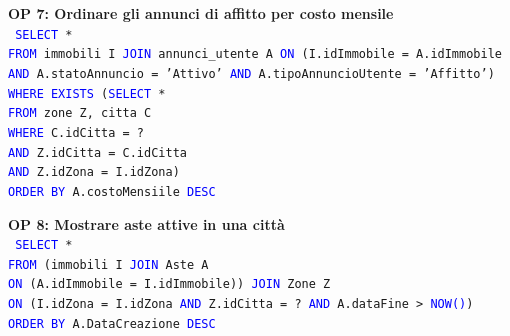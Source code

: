 \documentclass[a4paper,12pt]{report}
\begin{document}
            \noindent
            \textbf{OP 7: Ordinare gli annunci di affitto per costo mensile} \\
            \texttt{
                \textcolor{blue}{SELECT} * \\
                \textcolor{blue}{FROM} immobili I \textcolor{blue}{JOIN} annunci\_utente A \textcolor{blue}{ON} (I.idImmobile = A.idImmobile \textcolor{blue}{AND} A.statoAnnuncio = 'Attivo' \textcolor{blue}{AND} A.tipoAnnuncioUtente = 'Affitto') \\
                \textcolor{blue}{WHERE EXISTS} (\textcolor{blue}{SELECT} * \\
                    \null\qquad\qquad\qquad\quad\textcolor{blue}{FROM} zone Z, citta C \\
                    \null\qquad\qquad\qquad\quad\textcolor{blue}{WHERE} C.idCitta = ? \\
                    \null\qquad\qquad\qquad\quad\textcolor{blue}{AND} Z.idCitta = C.idCitta \\
                    \null\qquad\qquad\qquad\quad\textcolor{blue}{AND} Z.idZona = I.idZona) \\
                \textcolor{blue}{ORDER BY} A.costoMensiile \textcolor{blue}{DESC} \\
            }
            
            \noindent
            \textbf{OP 8: Mostrare aste attive in una città} \\
            \texttt{
                \textcolor{blue}{SELECT} * \\
                \textcolor{blue}{FROM} (immobili I \textcolor{blue}{JOIN} Aste A \\ 
                \textcolor{blue}{ON} (A.idImmobile = I.idImmobile)) \textcolor{blue}{JOIN} Zone Z \\ 
                \textcolor{blue}{ON} (I.idZona = I.idZona \textcolor{blue}{AND} Z.idCitta = ? \textcolor{blue}{AND} A.dataFine > \textcolor{blue}{NOW()}) \\
                \textcolor{blue}{ORDER BY} A.DataCreazione  \textcolor{blue}{DESC} \\
            }
            
\end{document}
